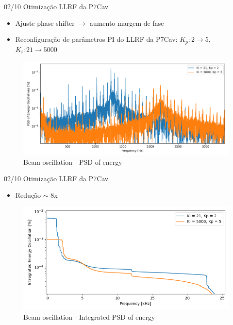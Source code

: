 \documentclass{beamer}					%
\begin{document}
\begin{frame}{02/10 Otimização LLRF da P7Cav}

    \begin{itemize}
        \item Ajuste phase shifter $\to$ aumento margem de fase
		\item Reconfiguração de parâmetros PI do LLRF da P7Cav: \newline 
        $K_p: 2 \to 5$, $K_i: 21 \to 5000$
	\end{itemize}

    \begin{figure}[H]
		\centering
        \includegraphics[width=.9\textwidth]{figures/llrf-energy-oscillations.png}
        \caption{Beam oscillation - PSD of energy}
        \label{fig:figure1}
    \end{figure}

\end{frame}



\begin{frame}{02/10 Otimização LLRF da P7Cav}

\begin{itemize}
		\item Redução $\sim$ 8x
\end{itemize}
 
\begin{figure}[H]
		\centering
        \includegraphics[width=.9\textwidth]{figures/llrf-integrated-energy-oscillations.png}
        \caption{Beam oscillation - Integrated PSD of energy}
        \label{fig:figure1}
\end{figure}

\end{frame}
\end{document}
